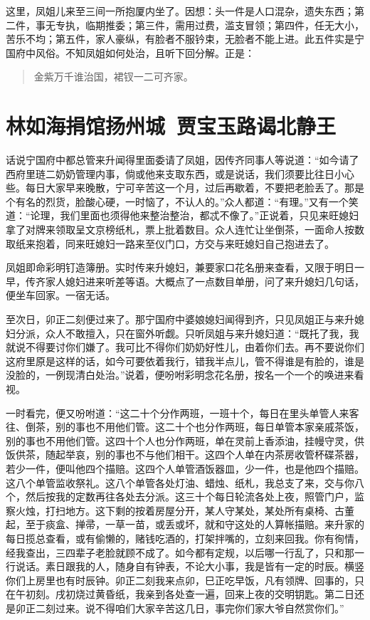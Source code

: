 \documentclass[12pt,oneside]{book}
\newenvironment{shici}{%
\begin{verse}%
\centering\large\hspace{12pt}}%
{\end{verse}}
\begin{document}
这里，凤姐儿来至三间一所抱厦内坐了。因想：头一件是人口混杂，遗失东西；第二件，事无专执，临期推委；第三件，需用过费，滥支冒领；第四件，任无大小，苦乐不均；第五件，家人豪纵，有脸者不服钤束，无脸者不能上进。此五件实是宁国府中风俗。不知凤姐如何处治，且听下回分解。正是：

\begin{shici}
金紫万千谁治国，裙钗一二可齐家。
\end{shici}

 
\chapter{林如海捐馆扬州城~贾宝玉路谒北静王}
话说宁国府中都总管来升闻得里面委请了凤姐，因传齐同事人等说道：“如今请了西府里琏二奶奶管理内事，倘或他来支取东西，或是说话，我们须要比往日小心些。每日大家早来晚散，宁可辛苦这一个月，过后再歇着，不要把老脸丢了。那是个有名的烈货，脸酸心硬，一时恼了，不认人的。”众人都道：“有理。”又有一个笑道：“论理，我们里面也须得他来整治整治，都忒不像了。”正说着，只见来旺媳妇拿了对牌来领取呈文京榜纸札，票上批着数目。众人连忙让坐倒茶，一面命人按数取纸来抱着，同来旺媳妇一路来至仪门口，方交与来旺媳妇自己抱进去了。

凤姐即命彩明钉造簿册。实时传来升媳妇，兼要家口花名册来查看，又限于明日一早，传齐家人媳妇进来听差等语。大概点了一点数目单册，问了来升媳妇几句话，便坐车回家。一宿无话。

至次日，卯正二刻便过来了。那宁国府中婆娘媳妇闻得到齐，只见凤姐正与来升媳妇分派，众人不敢擅入，只在窗外听觑。只听凤姐与来升媳妇道：“既托了我，我就说不得要讨你们嫌了。我可比不得你们奶奶好性儿，由着你们去。再不要说你们这府里原是这样的话，如今可要依着我行，错我半点儿，管不得谁是有脸的，谁是没脸的，一例现清白处治。”说着，便吩咐彩明念花名册，按名一个一个的唤进来看视。

一时看完，便又吩咐道：“这二十个分作两班，一班十个，每日在里头单管人来客往、倒茶，别的事也不用他们管。这二十个也分作两班，每日单管本家亲戚茶饭，别的事也不用他们管。这四十个人也分作两班，单在灵前上香添油，挂幔守灵，供饭供茶，随起举哀，别的事也不与他们相干。这四个人单在内茶房收管杯碟茶器，若少一件，便叫他四个描赔。这四个人单管酒饭器皿，少一件，也是他四个描赔。这八个单管监收祭礼。这八个单管各处灯油、蜡烛、纸札，我总支了来，交与你八个，然后按我的定数再往各处去分派。这三十个每日轮流各处上夜，照管门户，监察火烛，打扫地方。这下剩的按着房屋分开，某人守某处，某处所有桌椅、古董起，至于痰盒、掸帚，一草一苗，或丢或坏，就和守这处的人算帐描赔。来升家的每日揽总查看，或有偷懒的，赌钱吃酒的，打架拌嘴的，立刻来回我。你有徇情，经我查出，三四辈子老脸就顾不成了。如今都有定规，以后哪一行乱了，只和那一行说话。素日跟我的人，随身自有钟表，不论大小事，我是皆有一定的时辰。横竖你们上房里也有时辰钟。卯正二刻我来点卯，巳正吃早饭，凡有领牌、回事的，只在午初刻。戌初烧过黄昏纸，我亲到各处查一遍，回来上夜的交明钥匙。第二日还是卯正二刻过来。说不得咱们大家辛苦这几日，事完你们家大爷自然赏你们。”
\end{document}
